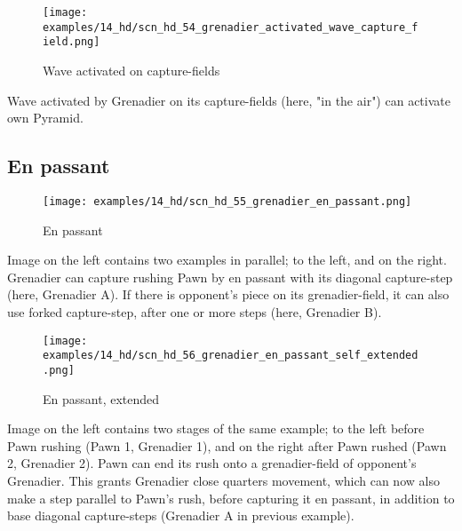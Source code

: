 \vspace*{0.1\baselineskip}
\noindent
\begin{figure}[!h]
\texttt{[image: examples/14\_hd/scn\_hd\_54\_grenadier\_activated\_wave\_capture\_field.png]}
\vspace*{-1.4\baselineskip}
\caption{Wave activated on capture-fields}
\label{fig:scn_hd_54_grenadier_activated_wave_capture_field}
\end{figure}

\vspace*{-0.5\baselineskip}
Wave activated by Grenadier on its capture-fields (here, "in the air") can activate own
Pyramid.

\clearpage %

\subsection*{En passant}
\label{sec:Hemera's Dawn/Grenadier/En passant}

\vspace*{-1.1\baselineskip}
\noindent
\begin{wrapfigure}[10]{l}{0.4\textwidth}
\centering
\texttt{[image: examples/14\_hd/scn\_hd\_55\_grenadier\_en\_passant.png]}
\vspace*{-1.4\baselineskip}
\caption{En passant}
\label{fig:scn_hd_55_grenadier_en_passant}
\end{wrapfigure}
Image on the left contains two examples in parallel; to the left, and on the right. \newline
\indent
Grenadier can capture rushing Pawn by en passant with its diagonal capture-step (here,
Grenadier A). If there is opponent's piece on its grenadier-field, it can also use
forked capture-step, after one or more steps (here, Grenadier B).

\vspace*{3.1\baselineskip}
\noindent
\begin{wrapfigure}[15]{l}{0.4\textwidth}
\centering
\texttt{[image: examples/14\_hd/scn\_hd\_56\_grenadier\_en\_passant\_self\_extended.png]}
\vspace*{-1.4\baselineskip}
\caption{En passant, extended}
\label{fig:scn_hd_56_grenadier_en_passant_self_extended}
\end{wrapfigure}
Image on the left contains two stages of the same example; to the left before Pawn
rushing (Pawn 1, Grenadier 1), and on the right after Pawn rushed (Pawn 2, Grenadier
2). \newline
\indent
Pawn can end its rush onto a grenadier-field of opponent's Grenadier. This grants
Grenadier close quarters movement, which can now also make a step parallel to Pawn's
rush, before capturing it en passant, in addition to base diagonal capture-steps
(Grenadier A in previous example).

